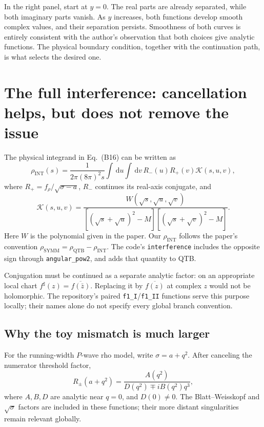 \documentclass[11pt,a4paper]{article}
\newcommand{\dd}{\,\mathrm d}
\newcommand{\INT}{\mathrm{INT}}
\newcommand{\QTB}{\mathrm{QTB}}
\begin{document}
In the right panel, start at $y=0$. The real parts are already separated, while both imaginary parts vanish. As $y$ increases, both functions develop smooth complex values, and their separation persists. Smoothness of both curves is entirely consistent with the author's observation that both choices give analytic functions. The physical boundary condition, together with the continuation path, is what selects the desired one.
\FloatBarrier

\section{The full interference: cancellation helps, but does not remove the issue}
The physical integrand in Eq.~(B16) can be written as
\begin{equation}
 \rho_\INT(s)=\frac{1}{2\pi(8\pi)^2s}\int\dd u\int\dd v\,
 R_-(u)R_+(v)\mathcal K(s,u,v),
 \label{eq:full}
\end{equation}
where $R_+=f_\rho/\sqrt{\sigma-a}$, $R_-$ continues its real-axis conjugate, and
\begin{equation}
 \mathcal K(s,u,v)=\frac{W(\sqrt s,\sqrt u,\sqrt v)}
 {[(\sqrt s+\sqrt u)^2-M][(\sqrt s+\sqrt v)^2-M]}.
\end{equation}
Here $W$ is the polynomial given in the paper. Our $\rho_\INT$ follows the paper's convention $\rho_{\mathrm{SYMM}}=\rho_\QTB-\rho_\INT$. The code's \texttt{interference} includes the opposite sign through \texttt{angular\_pow2}, and adds that quantity to QTB.

Conjugation must be continued as a separate analytic factor: on an appropriate local chart $f^\sharp(z)=\overline{f(\bar z)}$. Replacing it by $\overline{f(z)}$ at complex $z$ would not be holomorphic. The repository's paired \texttt{f1\_I}/\texttt{f1\_II} functions serve this purpose locally; their names alone do not specify every global branch convention.

\subsection{Why the toy mismatch is much larger}
For the running-width $P$-wave rho model, write $\sigma=a+q^2$. After canceling the numerator threshold factor,
\begin{equation}
 R_\pm(a+q^2)=\frac{A(q^2)}{D(q^2)\mp iB(q^2)q^3},
 \label{eq:reduced}
\end{equation}
where $A,B,D$ are analytic near $q=0$, and $D(0)\ne0$. The Blatt--Weisskopf and $\sqrt\sigma$ factors are included in these functions; their more distant singularities remain relevant globally.
\end{document}
